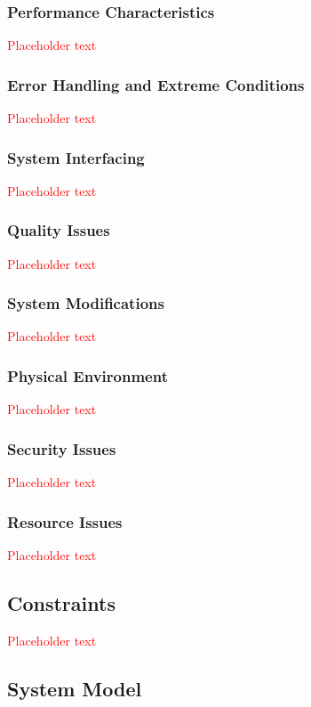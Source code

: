 \documentclass[a4paper, 11pt, titlepage]{article}
\begin{document}
\subsubsection{Performance Characteristics}
\textcolor{red}{Placeholder text}

\subsubsection{Error Handling and Extreme Conditions}
\textcolor{red}{Placeholder text}

\subsubsection{System Interfacing}
\textcolor{red}{Placeholder text}

\subsubsection{Quality Issues}
\textcolor{red}{Placeholder text}

\subsubsection{System Modifications}
\textcolor{red}{Placeholder text}

\subsubsection{Physical Environment}
\textcolor{red}{Placeholder text}

\subsubsection{Security Issues}
\textcolor{red}{Placeholder text}

\subsubsection{Resource Issues}
\textcolor{red}{Placeholder text}

\subsection{Constraints}
\textcolor{red}{Placeholder text}

\subsection{System Model}
\end{document}

